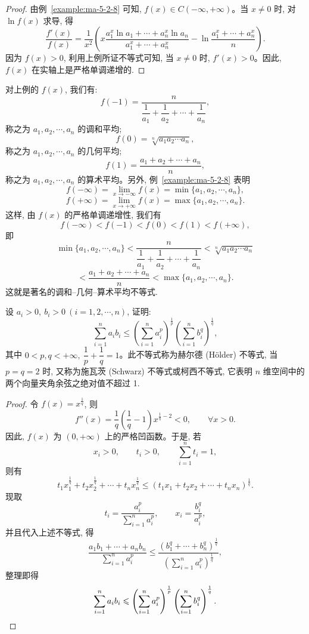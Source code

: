 \begin{proof}
由例~\ref{example:ma-5-2-8} 可知, $f(x)\in C(-\infty,+\infty)$。当 $x\ne0$ 时, 对 $\ln f(x)$ 求导, 得
\[
  \frac{f'(x)}{f(x)}
  =\frac1{x^2}\left(
  x\frac{a_1^x\ln a_1+\cdots+a_n^x\ln a_n}{a_1^x+\cdots+a_n^x}
  -\ln\frac{a_1^x+\cdots+a_n^x}{n}\right).
\]
因为 $f(x)>0$, 利用上例所证不等式可知, 当 $x\ne0$ 时, $f'(x)>0$。因此, $f(x)$ 在实轴上是严格单调递增的.
\end{proof}


\begin{remark}\label{remark:ma-5-source-133}
对上例的 $f(x)$, 我们有:
\[
  f(-1)=\frac{n}{\dfrac1{a_1}+\dfrac1{a_2}+\cdots+\dfrac1{a_n}},
\]
称之为 $a_1,a_2,\cdots,a_n$ 的调和平均;
\[
  f(0)=\sqrt[n]{a_1a_2\cdots a_n},
\]
称之为 $a_1,a_2,\cdots,a_n$ 的几何平均;
\[
  f(1)=\frac{a_1+a_2+\cdots+a_n}{n},
\]
称之为 $a_1,a_2,\cdots,a_n$ 的算术平均。另外, 例~\ref{example:ma-5-2-8} 表明
\[
  f(-\infty)=\lim_{x\to-\infty}f(x)=\min\{a_1,a_2,\cdots,a_n\},
\]
\[
  f(+\infty)=\lim_{x\to+\infty}f(x)=\max\{a_1,a_2,\cdots,a_n\}.
\]
这样, 由 $f(x)$ 的严格单调递增性, 我们有
\[
  f(-\infty)<f(-1)<f(0)<f(1)<f(+\infty),
\]
即
\[
  \min\{a_1,a_2,\cdots,a_n\}
  <\frac{n}{\dfrac1{a_1}+\dfrac1{a_2}+\cdots+\dfrac1{a_n}}
  <\sqrt[n]{a_1a_2\cdots a_n}
\]
\[
  <\frac{a_1+a_2+\cdots+a_n}{n}
  <\max\{a_1,a_2,\cdots,a_n\}.
\]
这就是著名的调和--几何--算术平均不等式.
\end{remark}


\begin{example}\label{example:ma-5-4-11}
设 $a_i>0,\ b_i>0\ (i=1,2,\cdots,n)$, 证明:
\[
  \sum_{i=1}^n a_i b_i
  \leqslant
  \left(\sum_{i=1}^n a_i^p\right)^{\frac1p}
  \left(\sum_{i=1}^n b_i^q\right)^{\frac1q},
\]
其中 $0<p,q<+\infty,\ \dfrac1p+\dfrac1q=1$。此不等式称为赫尔德 (H\"older) 不等式, 当 $p=q=2$ 时, 又称为施瓦茨 (Schwarz) 不等式或柯西不等式, 它表明 $n$ 维空间中的两个向量夹角余弦之绝对值不超过 1.
\end{example}


\begin{proof}
令 $f(x)=x^{\frac1q}$, 则
\[
  f''(x)=\frac1q\left(\frac1q-1\right)x^{\frac1q-2}<0,\qquad \forall x>0.
\]
因此, $f(x)$ 为 $(0,+\infty)$ 上的严格凹函数。于是, 若
\[
  x_i>0,\qquad t_i>0,\qquad \sum_{i=1}^n t_i=1,
\]
则有
\[
  t_1x_1^{\frac1q}+t_2x_2^{\frac1q}+\cdots+t_nx_n^{\frac1q}
  \leqslant (t_1x_1+t_2x_2+\cdots+t_nx_n)^{\frac1q}.
\]
现取
\[
  t_i=\frac{a_i^p}{\sum_{i=1}^n a_i^p},\qquad x_i=\frac{b_i^q}{a_i^p},
\]
并且代入上述不等式, 得
\[
  \frac{a_1b_1+\cdots+a_nb_n}{\sum_{i=1}^n a_i^p}
  \leqslant
  \frac{(b_1^q+\cdots+b_n^q)^{\frac1q}}{\left(\sum_{i=1}^n a_i^p\right)^{\frac1q}},
\]
整理即得
\[
  \sum_{i=1}^n a_i b_i
  \leqslant
  \left(\sum_{i=1}^n a_i^p\right)^{\frac1p}
  \left(\sum_{i=1}^n b_i^q\right)^{\frac1q}.
\qedhere
\]
\end{proof}


